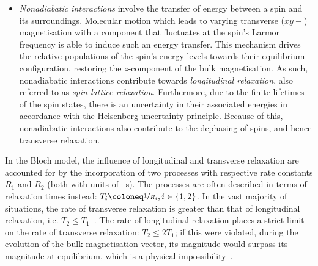 {\begin{itemize}
            effect of this is for the transverse component of the bulk
            magnetisation to decay. Hence, adiabatic interactions contribute to
            \emph{transverse relaxation}, also referred to as \emph{spin-spin
            relaxation}.
        \item \emph{Nonadiabatic interactions} involve the transfer of energy
            between a spin and its surroundings. Molecular motion which leads
            to varying transverse ($xy-$) magnetisation with a component that
            fluctuates at the spin's Larmor frequency is able to induce such an
            energy transfer. This mechanism drives the relative populations of
            the spin's energy levels towards their equilibrium configuration,
            restoring the $z$-component of the bulk magnetisation.
            As such, nonadiabatic interactions contribute towards
            \emph{longitudinal relaxation}, also referred to as
            \emph{spin-lattice relaxation}.
            Furthermore, due to the finite lifetimes of the spin states, there
            is an uncertainty in their associated energies in accordance with
            the Heisenberg uncertainty principle. Because of this, nonadiabatic
            interactions also contribute to the dephasing of spins, and hence
            transverse relaxation.
    \end{itemize}
    In the Bloch model, the influence of longitudinal and transverse relaxation are
    accounted for by the incorporation of two processes with respective rate
    constants $R_1$ and $R_2$ (both with units of \unit{\per\second}). The
    processes are often described in terms of relaxation times
    instead: $T_i \coloneq \nicefrac{1}{R_i}, i \in \lbrace 1, 2\rbrace$.  In
    the vast majority of situations, the rate of transverse relaxation is
    greater than that of longitudinal relaxation, i.e. $T_2 \leq
    T_1$~\cite[Section 11.9]{Levitt2007}. The rate of longitudinal relaxation
    places a strict limit on the rate of transverse relaxation: $T_2 \leq 2
    T_1$; if this were violated, during the evolution of the bulk magnetisation
    vector, its magnitude would surpass its magnitude at equilibrium, which is
    a physical impossibility~\cite{Traficante1991}.
}


